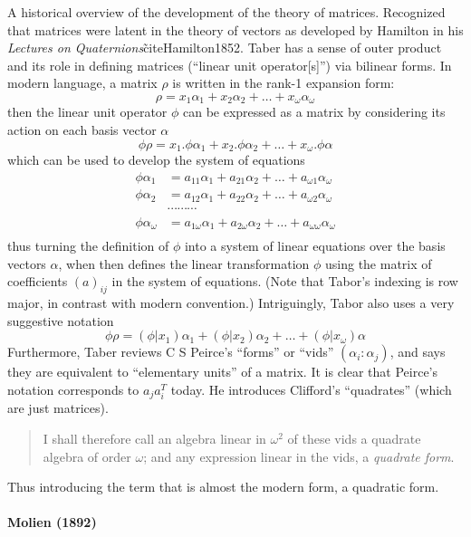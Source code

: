 A historical overview of the development of the theory of matrices.
Recognized that matrices were latent in the theory of vectors as developed by Hamilton in his \textit{Lectures on Quaternions}\~cite{Hamilton1852}.
Taber has a sense of outer product and its role in defining matrices (``linear unit operator[s]'') via bilinear forms. In modern language,
a matrix $\rho$ is written in the rank-1 expansion form:
\[
\rho = x_1 \alpha_1 + x_2 \alpha_2 + \dots + x_\omega \alpha_\omega
\]
then the linear unit operator $\phi$ can be expressed as a matrix by considering its action on each basis vector $\alpha$
\[
\phi\rho = x_1.\phi\alpha_1 + x_2.\phi\alpha_2 + \dots + x_\omega.\phi\alpha
\]
which can be used to develop the system of equations
\begin{align}
\phi \alpha_1 & = a_{11} \alpha_1 + a_{21} \alpha_2 + \dots + a_{\omega 1} \alpha_\omega \\
\phi \alpha_2 & = a_{12} \alpha_1 + a_{22} \alpha_2 + \dots + a_{\omega 2} \alpha_\omega \\
              & \cdots \cdots \cdots \\
\phi \alpha_\omega & = a_{1\omega} \alpha_1 + a_{2\omega} \alpha_2 + \dots + a_{\omega \omega} \alpha_\omega \\
\end{align}
thus turning the definition of $\phi$ into a system of linear equations over the basis vectors $\alpha$, when then defines the linear transformation $\phi$ using the matrix of coefficients $(a)_{ij}$ in the system of equations.
(Note that Tabor's indexing is row major, in contrast with modern convention.)
Intriguingly, Tabor also uses a very suggestive notation
\[
\phi\rho = (\phi|x_1)\alpha_1 + (\phi|x_2)\alpha_2 + \dots + (\phi|x_\omega)\alpha
\]
Furthermore, Taber reviews C S Peirce's ``forms'' or ``vids'' $(\alpha_i : \alpha_j)$, and says they are equivalent to ``elementary units'' of a matrix. It is clear that Peirce's notation corresponds to $a_j a_i^T$ today.
He introduces Clifford's ``quadrates'' (which are just matrices).
\begin{quote}
I shall therefore call an algebra linear in $\omega^2$ of these vids a quadrate algebra of order $\omega$; and any expression linear in the vids, a \textit{quadrate form}.
\end{quote}
Thus introducing the term that is almost the modern form, a quadratic form.

\paragraph{Molien (1892)~\cite{Molien1892}}


